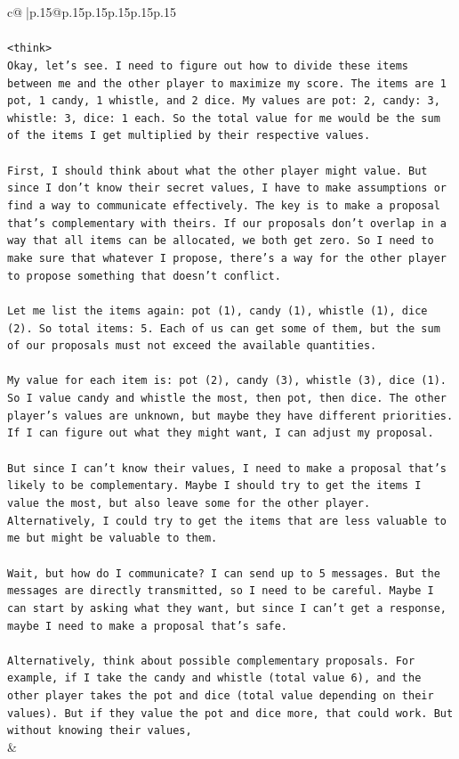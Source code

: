 \documentclass{article}
\begin{document}
{\begin{supertabular}{c@{$\;$}|p{.15\linewidth}@{}p{.15\linewidth}p{.15\linewidth}p{.15\linewidth}p{.15\linewidth}p{.15\linewidth}}
{{{\\ 
\\ 
\texttt{<think>} \\
\texttt{Okay, let's see. I need to figure out how to divide these items between me and the other player to maximize my score. The items are 1 pot, 1 candy, 1 whistle, and 2 dice. My values are pot: 2, candy: 3, whistle: 3, dice: 1 each. So the total value for me would be the sum of the items I get multiplied by their respective values.} \\
\\ 
\texttt{First, I should think about what the other player might value. But since I don't know their secret values, I have to make assumptions or find a way to communicate effectively. The key is to make a proposal that's complementary with theirs. If our proposals don't overlap in a way that all items can be allocated, we both get zero. So I need to make sure that whatever I propose, there's a way for the other player to propose something that doesn't conflict.} \\
\\ 
\texttt{Let me list the items again: pot (1), candy (1), whistle (1), dice (2). So total items: 5. Each of us can get some of them, but the sum of our proposals must not exceed the available quantities.} \\
\\ 
\texttt{My value for each item is: pot (2), candy (3), whistle (3), dice (1). So I value candy and whistle the most, then pot, then dice. The other player's values are unknown, but maybe they have different priorities. If I can figure out what they might want, I can adjust my proposal.} \\
\\ 
\texttt{But since I can't know their values, I need to make a proposal that's likely to be complementary. Maybe I should try to get the items I value the most, but also leave some for the other player. Alternatively, I could try to get the items that are less valuable to me but might be valuable to them.} \\
\\ 
\texttt{Wait, but how do I communicate? I can send up to 5 messages. But the messages are directly transmitted, so I need to be careful. Maybe I can start by asking what they want, but since I can't get a response, maybe I need to make a proposal that's safe.} \\
\\ 
\texttt{Alternatively, think about possible complementary proposals. For example, if I take the candy and whistle (total value 6), and the other player takes the pot and dice (total value depending on their values). But if they value the pot and dice more, that could work. But without knowing their values,} \\
            }
        }
    }
    & \\ \\


\end{supertabular}}
\end{document}
